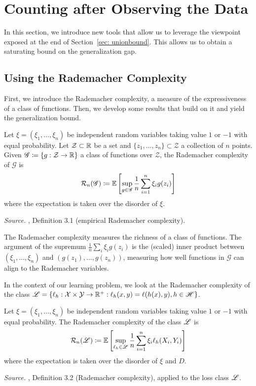 \documentclass[reqno]{amsart}
\let\oldsection\section
\renewcommand{\section}{\clearpage\thispagestyle{plain}\oldsection}
\begin{document}
\newpage

\section{Counting after Observing the Data}\label{sec: counting}
In this section, we introduce new tools that allow us to leverage the viewpoint exposed at the end of Section~\ref{sec: unionbound}. This allows us to obtain a saturating bound on the generalization gap. 

\subsection{Using the Rademacher Complexity}\label{sec: rademmassart}
First, we introduce the Rademacher complexity, a measure of the expressiveness of a class of functions. Then, we develop some results that build on it and yield the generalization bound. 

\begin{definition}\label{def: rad gen}
Let $\xi = (\xi_1,\ldots,\xi_n)$ be independent random variables taking value $1$ or $-1$ with equal probability. Let $\mathcal{Z} \subset \mathbb{R}$ be a set and $\{z_1,\ldots,z_n\}\subset \mathcal{Z}$ a collection of $n$ points. Given $\mathscr G\coloneq \{g:\mathcal{Z} \to \mathbb{R}\}$ a class of functions over $\mathcal{Z}$, the Rademacher complexity of $\mathscr G$ is
\[
\mathcal R_n(\mathscr G) \coloneq \mathbb{E} \left[\sup_{g \in \mathscr G}\frac{1}{n}\sum_{i=1}^n \xi_i g(z_i)\right]
\]
where the expectation is taken over the disorder of $\xi$. 

\textnormal{\emph{Source.} \cite{mohri2018foundations}, Definition 3.1 (empirical Rademacher complexity).}
\end{definition}

The Rademacher complexity measures the richness of a class of functions. The argument of the supremum $\frac{1}{n}\sum_i\xi_i g(z_i)$ is the (scaled) inner product between $(\xi_1,\ldots,\xi_n)$ and $(g(z_1),\ldots,g(z_n))$, measuring how well functions in $\mathscr G$ can align to the Rademacher variables.

In the context of our learning problem, we look at the Rademacher complexity of the class $\mathscr{L} =  \{\ell_h:\mathcal{X}\times\mathcal{Y}\to\mathbb{R}^+ :\ell_h(x,y) = \ell(h(x),y), h \in \mathscr{H} \}$. 

\begin{definition}\label{def: rad}
Let $\xi = (\xi_1,\ldots,\xi_n)$ be independent random variables taking value $1$ or $-1$ with equal probability. The Rademacher complexity of the class $\mathscr{L}$ is
\[
\mathcal R_n(\mathscr{L}) \coloneq \mathbb{E} \left[\sup_{\ell_h\in\mathscr{L}}\frac{1}{n}\sum_{i=1}^n \xi_i \ell_h(X_i, Y_i)\right]
\]
where the expectation is taken over the disorder of $\xi$ and $D$. 

\textnormal{\emph{Source.} \cite{mohri2018foundations}, Definition 3.2 (Rademacher complexity), applied to the loss class $\mathscr{L}$.}
\end{definition}
\end{document}
